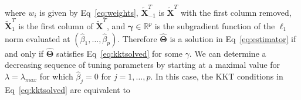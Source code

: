 \documentclass[10pt,letterpaper]{article}
\newcommand{\bX}{\textbf{X}}
\newcommand{\bXtilde}{\widetilde{\bX}}
\newcommand{\bTheta}{\boldsymbol{\Theta}}
\begin{document}
where $w_i$ is given by Eq~\ref{eq:weights}, $\bXtilde^T_{-1}$ is $\bXtilde^T$ with the first column removed, $\bXtilde^T_1$ is the first column of $\bXtilde^T$, and $\boldsymbol{\gamma} \in \mathbb{R}^p$ is the subgradient function of the $\ell_1$ norm evaluated at $(\hat{\beta}_1, \ldots, \hat{\beta}_p)$. Therefore $\widehat{\bTheta}$ is a solution in Eq~\ref{eq:estimator} if and only if $\widehat{\bTheta}$ satisfies Eq~\ref{eq:kktsolved} for some $\gamma$. %
We can determine a decreasing sequence of tuning parameters by starting at a maximal value for $\lambda = \lambda_{max}$ for which $\hat{\beta}_j = 0$ for $j=1, \ldots, p$. In this case, the KKT conditions in Eq~\ref{eq:kktsolved} are equivalent to
\end{document}
